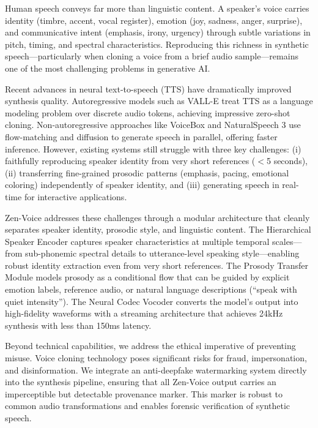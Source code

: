 \documentclass[11pt,a4paper]{article}
\begin{document}
Human speech conveys far more than linguistic content. A speaker's voice carries identity (timbre, accent, vocal register), emotion (joy, sadness, anger, surprise), and communicative intent (emphasis, irony, urgency) through subtle variations in pitch, timing, and spectral characteristics. Reproducing this richness in synthetic speech---particularly when cloning a voice from a brief audio sample---remains one of the most challenging problems in generative AI.

Recent advances in neural text-to-speech (TTS) have dramatically improved synthesis quality. Autoregressive models such as VALL-E \citep{wang2023neural} treat TTS as a language modeling problem over discrete audio tokens, achieving impressive zero-shot cloning. Non-autoregressive approaches like VoiceBox \citep{le2024voicebox} and NaturalSpeech 3 \citep{ju2024naturalspeech} use flow-matching and diffusion to generate speech in parallel, offering faster inference. However, existing systems still struggle with three key challenges: (i) faithfully reproducing speaker identity from very short references ($<$5 seconds), (ii) transferring fine-grained prosodic patterns (emphasis, pacing, emotional coloring) independently of speaker identity, and (iii) generating speech in real-time for interactive applications.

Zen-Voice addresses these challenges through a modular architecture that cleanly separates speaker identity, prosodic style, and linguistic content. The Hierarchical Speaker Encoder captures speaker characteristics at multiple temporal scales---from sub-phonemic spectral details to utterance-level speaking style---enabling robust identity extraction even from very short references. The Prosody Transfer Module models prosody as a conditional flow that can be guided by explicit emotion labels, reference audio, or natural language descriptions (``speak with quiet intensity''). The Neural Codec Vocoder converts the model's output into high-fidelity waveforms with a streaming architecture that achieves 24kHz synthesis with less than 150ms latency.

Beyond technical capabilities, we address the ethical imperative of preventing misuse. Voice cloning technology poses significant risks for fraud, impersonation, and disinformation. We integrate an anti-deepfake watermarking system directly into the synthesis pipeline, ensuring that all Zen-Voice output carries an imperceptible but detectable provenance marker. This marker is robust to common audio transformations and enables forensic verification of synthetic speech.
\end{document}

